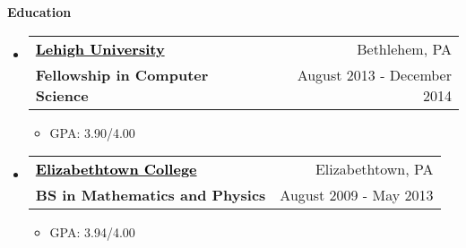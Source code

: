 \documentclass[letterpaper,12pt]{article}
\makeatletter
\newcommand{\link}[2]{\href{#1}{\textcolor{black}{#2}}}
\newcommand{\resitem}[1]{\item #1 \vspace{-2pt}}
\newcommand{\resheading}[1]{{\large \colorbox{mygrey}{\begin{minipage}{\textwidth}{\textbf{\sc #1 \vphantom{p\^{E}}}}\end{minipage}}}}
\newcommand{\ressubheading}[4]{
	\begin{tabular*}{6.5in}{l@{\extracolsep{\fill}}r}
			\textbf{#1} & #2 \\
			\textbf{#3} & #4 \\
	\end{tabular*}\vspace{-6pt}
}
\makeatother
\begin{document}
\resheading{Education}
	\begin{itemize}
        \item \ressubheading
            {\link{http://www.cse.lehigh.edu/}{Lehigh University}}
            {Bethlehem, PA}
            {Fellowship in Computer Science}
            {August 2013 - December 2014}
                \begin{itemize}
                    \resitem{GPA: 3.90/4.00}
                \end{itemize}
        \item \ressubheading
            {\link{http://www.etown.edu}{Elizabethtown College}}
            {Elizabethtown, PA}
            {BS in Mathematics and Physics}
            {August 2009 - May 2013}
                \begin{itemize}
                    \resitem{GPA: 3.94/4.00}
                \end{itemize}	
	\end{itemize} %
\end{document}
